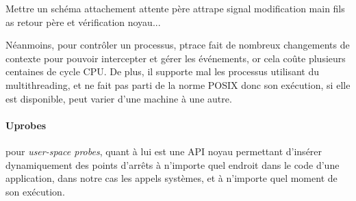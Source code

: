 {\color{red} Mettre un schéma attachement attente père attrape signal
  modification main fils as retour père et vérification noyau...}

Néanmoins, pour contrôler un processus, ptrace fait de nombreux changements de
contexte pour pouvoir intercepter et gérer les événements, or cela coûte
plusieurs centaines de cycle CPU. De plus, il supporte mal les processus
utilisant du multithreading, et ne fait pas parti de la norme POSIX donc son
exécution, si elle est disponible, peut varier d'une machine à une autre.

\paragraph{Uprobes}\citet{INTERCEPTIONAS, INTERCEPTIONMARION}



pour \textit{user-space probes}, quant à lui est une API noyau permettant
d'insérer dynamiquement des points d'arrêts à n'importe quel endroit dans le
code d'une application, dans notre cas les appels systèmes, et à n'importe quel
moment de son exécution.

